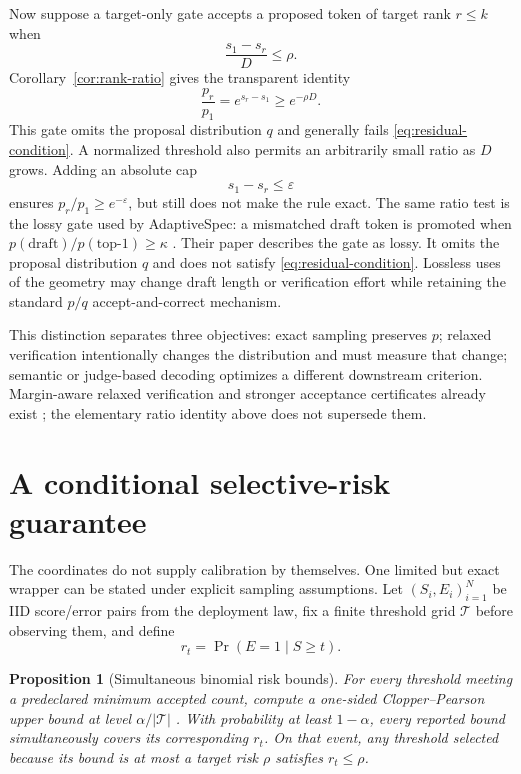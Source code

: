 \documentclass[11pt]{article}
\newtheorem{proposition}[theorem]{Proposition}
\theoremstyle{definition}
\theoremstyle{remark}
\newcommand{\1}{\mathbf{1}}
\begin{document}
Now suppose a target-only gate accepts a proposed token of target rank
$r\leq k$ when
\[
  \frac{s_1-s_r}{D}\leq\rho.
\]
Corollary~\ref{cor:rank-ratio} gives the transparent identity
\[
  \frac{p_r}{p_1}=e^{s_r-s_1}\geq e^{-\rho D}.
\]
This gate omits the proposal distribution $q$ and generally fails
\eqref{eq:residual-condition}.  A normalized threshold also permits an
arbitrarily small ratio as $D$ grows.  Adding an absolute cap
\[
  s_1-s_r\leq\varepsilon
\]
ensures $p_r/p_1\geq e^{-\varepsilon}$, but still does not make the rule exact.
The same ratio test is the lossy gate used by AdaptiveSpec: a mismatched draft
token is promoted when
$p(\mathrm{draft})/p(\mathrm{top\text{-}1})\geq\kappa$
\cite{urban2026adaptivespec}.  Their paper describes the gate as lossy.  It
omits the proposal distribution $q$ and does not satisfy
\eqref{eq:residual-condition}.  Lossless uses of the geometry may change
draft length or verification effort while retaining the standard $p/q$
accept-and-correct mechanism.

This distinction separates three objectives: exact sampling preserves $p$;
relaxed verification intentionally changes the distribution and must measure
that change; semantic or judge-based decoding optimizes a different downstream
criterion.  Margin-aware relaxed verification and stronger acceptance
certificates already exist \cite{song2026mars,urban2026adaptivespec,sharma2026}; the elementary ratio
identity above does not supersede them.

\section{A conditional selective-risk guarantee}

The coordinates do not supply calibration by themselves.  One limited but
exact wrapper can be stated under explicit sampling assumptions.  Let
$(S_i,E_i)_{i=1}^{N}$ be IID score/error pairs from the deployment law, fix a
finite threshold grid $\mathcal{T}$ before observing them, and define
\[
  r_t=\Pr(E=1\mid S\geq t).
\]

\begin{proposition}[Simultaneous binomial risk bounds]
For every threshold meeting a predeclared minimum accepted count, compute a
one-sided Clopper--Pearson upper bound at level
$\alpha/|\mathcal{T}|$ \cite{clopper1934}.  With probability at least
$1-\alpha$, every reported bound simultaneously covers its corresponding
$r_t$.  On that event, any threshold selected because its bound is at most a
target risk $\rho$ satisfies $r_t\leq\rho$.
\end{proposition}
\end{document}

